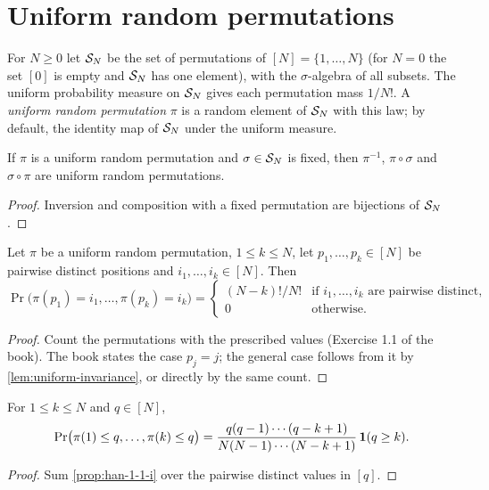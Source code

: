 \chapter{Uniform random permutations}
\label{chap:permutations}

\begin{definition}
  \label{def:uniform-permutation}
  For $N\ge0$ let $\mathcal{S}_N$ be the set of permutations of $[N]=\{1,\dots,N\}$ (for $N=0$ the set $[0]$ is empty and $\mathcal{S}_N$ has one element), with the $\sigma$-algebra of all subsets. The uniform probability measure on $\mathcal{S}_N$ gives each permutation mass $1/N!$. A \emph{uniform random permutation} $\pi$ is a random element of $\mathcal{S}_N$ with this law; by default, the identity map of $\mathcal{S}_N$ under the uniform measure.
\end{definition}

\begin{lemma}[Invariance]
  \label{lem:uniform-invariance}
  If $\pi$ is a uniform random permutation and $\sigma\in\mathcal{S}_N$ is fixed, then $\pi^{-1}$, $\pi\circ\sigma$ and $\sigma\circ\pi$ are uniform random permutations.
\end{lemma}
\begin{proof}
  Inversion and composition with a fixed permutation are bijections of $\mathcal{S}_N$.
\end{proof}

\begin{proposition}
  \label{prop:han-1-1-i}
  Let $\pi$ be a uniform random permutation, $1\le k\le N$, let $p_1,\dots,p_k\in[N]$ be pairwise distinct positions and $i_1,\dots,i_k\in[N]$. Then
  \[
    \Pr\bigl(\pi(p_1)=i_1,\dots,\pi(p_k)=i_k\bigr)=
    \begin{cases}
      (N-k)!/N! & \text{if } i_1,\dots,i_k \text{ are pairwise distinct},\\
      0 & \text{otherwise.}
    \end{cases}
  \]
\end{proposition}
\begin{proof}
  Count the permutations with the prescribed values (Exercise 1.1 of the book). The book states the case $p_j=j$; the general case follows from it by \cref{lem:uniform-invariance}, or directly by the same count.
\end{proof}

\begin{proposition}
  \label{prop:han-1-1-ii}
  For $1\le k\le N$ and $q\in[N]$,
  \[
    \Pr\bigl(\pi(1)\le q,\dots,\pi(k)\le q\bigr)=\frac{q(q-1)\cdots(q-k+1)}{N(N-1)\cdots(N-k+1)}\,\mathbf{1}(q\ge k).
  \]
\end{proposition}
\begin{proof}
  Sum \cref{prop:han-1-1-i} over the pairwise distinct values in $[q]$.
\end{proof}


